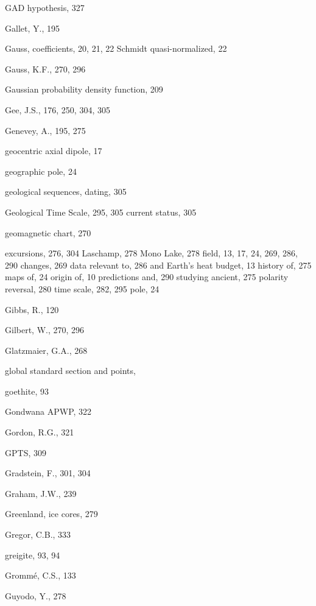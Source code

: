 \documentclass[,plain]{tauxe}
\begin{document}
\begin{theindex}
  \item GAD hypothesis, 327
  \item Gallet, Y., 195
  \item Gauss, coefficients, 20, 21, 22
    \subitem Schmidt quasi-normalized, 22
  \item Gauss, K.F., 270, 296
  \item Gaussian probability density function, 209
  \item Gee, J.S., 176, 250, 304, 305
  \item Genevey, A., 195, 275
  \item geocentric axial dipole, 17
  \item geographic pole, 24
  \item geological sequences, dating, 305
  \item Geological Time Scale, 295, 305
    \subitem current status, 305
  \item geomagnetic
  \subitem chart, 270  

\subitem excursions, 276, 304
      \subsubitem Laschamp, 278
      \subsubitem Mono Lake, 278
   \subitem field, 13, 17, 24, 269, 286, 290
    \subsubitem changes, 269
    \subsubitem data relevant to, 286
	\subsubitem and Earth's heat budget, 13    
	\subsubitem history of, 275
    \subsubitem maps of, 24
	\subsubitem origin of, 10
    \subsubitem predictions and, 290
    \subsubitem studying ancient, 275 
\subitem polarity
      \subsubitem reversal, 280
      \subsubitem time scale, 282, 295
    \subitem pole, 24
  
  \item Gibbs, R., 120
  \item Gilbert, W., 270, 296
  \item Glatzmaier, G.A., 268
  \item global standard section and points,
  \item goethite, 93
  \item Gondwana APWP, 322
  \item Gordon, R.G., 321
  \item GPTS, 309
  \item Gradstein, F., 301, 304
  \item Graham, J.W., 239
  \item Greenland, ice cores, 279
  \item Gregor, C.B., 333
  \item greigite, 93, 94
  \item Gromm\'e, C.S., 133
  \item Guyodo, Y., 278


\end{theindex}
\end{document}
